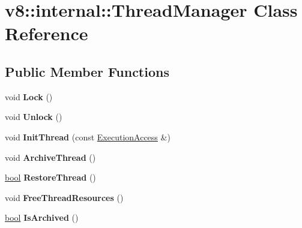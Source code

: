 \hypertarget{classv8_1_1internal_1_1ThreadManager}{}\section{v8\+:\+:internal\+:\+:Thread\+Manager Class Reference}
\label{classv8_1_1internal_1_1ThreadManager}
\subsection*{Public Member Functions}
\begin{DoxyCompactItemize}
\item 
\mbox{\label{classv8_1_1internal_1_1ThreadManager_a8de7abc8b0763f0e1117b61f074410da}} 
void {\bfseries Lock} ()
\item 
\mbox{\label{classv8_1_1internal_1_1ThreadManager_ab7d0f390011373f4b036548923add1bf}} 
void {\bfseries Unlock} ()
\item 
\mbox{\label{classv8_1_1internal_1_1ThreadManager_a82ab5fde3a1bffba6b7c03da73be99fc}} 
void {\bfseries Init\+Thread} (const \mbox{\hyperlink{classv8_1_1internal_1_1ExecutionAccess}{Execution\+Access}} \&)
\item 
\mbox{\label{classv8_1_1internal_1_1ThreadManager_a36506aaa6d781c749efe48996b48e2a0}} 
void {\bfseries Archive\+Thread} ()
\item 
\mbox{\label{classv8_1_1internal_1_1ThreadManager_ac7d4ad5d9a21d88fc2d50f5d91a62442}} 
\mbox{\hyperlink{classbool}{bool}} {\bfseries Restore\+Thread} ()
\item 
\mbox{\label{classv8_1_1internal_1_1ThreadManager_a7ff25a1bc335c55e57bae1f262f5ac0e}} 
void {\bfseries Free\+Thread\+Resources} ()
\item 
\mbox{\label{classv8_1_1internal_1_1ThreadManager_a8a5b4eb523ed06c372852b14b5825efb}} 
\mbox{\hyperlink{classbool}{bool}} {\bfseries Is\+Archived} ()
\item 

\end{DoxyCompactItemize}
